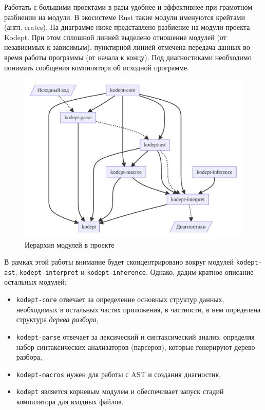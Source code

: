 Работать с большими проектами в разы удобнее и эффективнее при грамотном разбиении на модули.
В экосистеме Rust такие модули именуются крейтами (англ. crates).
На диаграмме ниже представлено разбиение на модули проекта Kodept.
При этом сплошной линией выделено отношение модулей (от независимых к зависимым), пунктирной линией отмечена передача данных во время работы программы (от начала к концу).
Под диагностиками необходимо понимать сообщения компилятора об исходной программе.

\begin{figure}[H]
    \centering
    \includegraphics[width=\textwidth]{figures/modules}
    \caption{Иерархия модулей в проекте}
    \label{fig:modules}
\end{figure}

В рамках этой работы внимание будет сконцентрировано вокруг модулей \lstinline{kodept-ast}, \lstinline{kodept-interpret} и \lstinline{kodept-inference}.
Однако, дадим кратное описание остальных модулей:
\begin{itemize}
    \item \lstinline{kodept-core} отвечает за определение основных структур данных, необходимых в остальных частях приложения, в частности, в нем определена структура \textit{дерева разбора},
    \item \lstinline{kodept-parse} отвечает за лексический и синтаксический анализ, определяя набор синтаксических анализаторов (парсеров), которые генерируют дерево разбора,
    \item \lstinline{kodept-macros} нужен для работы с AST и создания диагностик,
    \item \lstinline{kodept} является корневым модулем и обеспечивает запуск стадий компилятора для входных файлов.
\end{itemize}

